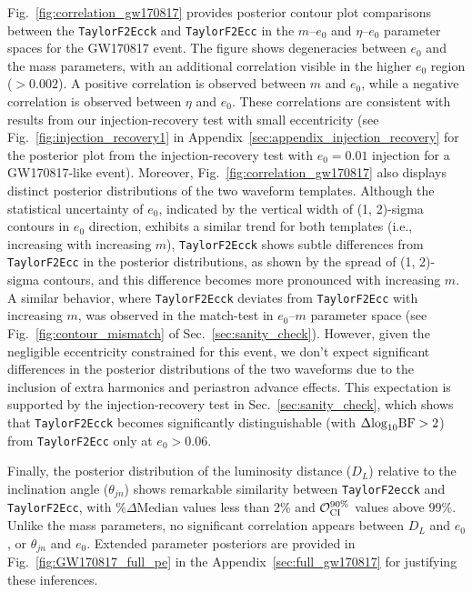 \documentclass[aps,prd,twocolumn,superscriptaddress,groupedaddress,nofootinbib,showpacs,eqsecnum,useAms]{revtex4-2}
\begin{document}
Fig.~\ref{fig:correlation_gw170817} provides posterior contour plot comparisons between the \texttt{TaylorF2Ecck} and \texttt{TaylorF2Ecc} in the $m$--$e_0$ and $\eta$--$e_0$ parameter spaces for the GW170817 event. The figure shows degeneracies between $e_0$ and the mass parameters, with an additional correlation visible in the higher $e_0$ region ($>0.002$). A positive correlation is observed between $m$ and $e_0$, while a negative correlation is observed between $\eta$ and $e_0$. 
These correlations are consistent with results from our injection-recovery test with small eccentricity (see Fig.~\ref{fig:injection_recovery1} in Appendix~\ref{sec:appendix_injection_recovery}  for the posterior plot from the injection-recovery test with $e_0 = 0.01$ injection for a GW170817-like event). 
Moreover, Fig.~\ref{fig:correlation_gw170817} also displays distinct posterior distributions of the two waveform templates. Although the statistical uncertainty of $e_0$, indicated by the vertical width of (1, 2)-sigma contours in $e_0$ direction, exhibits a similar trend for both templates (i.e., increasing with increasing $m$), 
\texttt{TaylorF2Ecck} shows subtle differences from \texttt{TaylorF2Ecc} in the posterior distributions, as shown by the spread of (1, 2)-sigma contours, and this difference becomes more pronounced with increasing $m$. A similar behavior, where \texttt{TaylorF2Ecck} deviates from \texttt{TaylorF2Ecc} with increasing $m$, was observed in the match-test in $e_0$--$m$ parameter space (see Fig.~\ref{fig:contour_mismatch} of Sec.~\ref{sec:sanity_check}). However, given the negligible eccentricity constrained for this event, we don't expect significant differences in the posterior distributions of the two waveforms due to the inclusion of extra harmonics and periastron advance effects. This expectation is supported by the injection-recovery test in Sec.~\ref{sec:sanity_check}, which shows that \texttt{TaylorF2Ecck} becomes significantly distinguishable (with $\Delta{\rm log}_{10}{\rm BF}>2$) from \texttt{TaylorF2Ecc} only at $e_0 > 0.06$.

Finally, the posterior distribution of the luminosity distance ($D_L$) relative to the inclination angle ($\theta_{jn}$) shows remarkable similarity between \texttt{TaylorF2ecck} and \texttt{TaylorF2Ecc}, with $\% \Delta \mathrm{Median}$ values less than 2\% and ${\cal O}_{\rm CI}^{90\%}$ values above 99\%. 
Unlike the mass parameters, no significant correlation appears between $D_L$ and $e_0$, or $\theta_{jn}$ and $e_0$. Extended parameter posteriors are provided in Fig.~\ref{fig:GW170817_full_pe} in the Appendix~\ref{sec:full_gw170817} for justifying 
these inferences.
\end{document}
